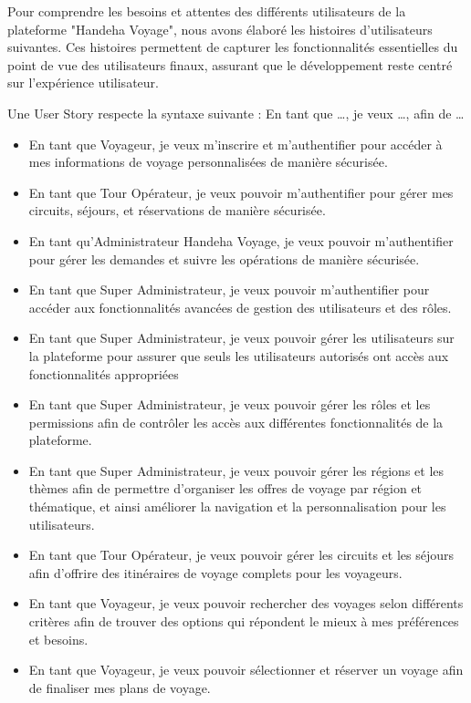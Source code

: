 \documentclass[12pt]{report}
\begin{document}
				\hspace{15pt} Pour comprendre les besoins et attentes des différents utilisateurs de la plateforme "Handeha Voyage", nous avons élaboré les histoires d’utilisateurs suivantes. Ces histoires permettent de capturer les fonctionnalités essentielles du point de vue des utilisateurs finaux, assurant que le développement reste centré sur l’expérience utilisateur. 

				Une User Story respecte la syntaxe suivante : En tant que …, je veux …, afin de …


				\begin{itemize}
					\item En tant que Voyageur, je veux m'inscrire et m'authentifier pour accéder à mes informations de voyage personnalisées de manière sécurisée.
					\item En tant que Tour Opérateur, je veux pouvoir m'authentifier pour gérer mes circuits, séjours, et réservations de manière sécurisée.
					\item En tant qu'Administrateur Handeha Voyage, je veux pouvoir m'authentifier pour gérer les demandes et suivre les opérations de manière sécurisée.
					\item En tant que Super Administrateur, je veux pouvoir m'authentifier pour accéder aux fonctionnalités avancées de gestion des utilisateurs et des rôles.
					\item En tant que Super Administrateur, je veux pouvoir gérer les utilisateurs sur la plateforme pour assurer que seuls les utilisateurs autorisés ont accès aux fonctionnalités appropriées
					\item En tant que Super Administrateur, je veux pouvoir gérer les rôles et les permissions afin de contrôler les accès aux différentes fonctionnalités de la plateforme.
					\item En tant que Super Administrateur, je veux pouvoir gérer les régions et les thèmes afin de permettre d'organiser les offres de voyage par région et thématique, et ainsi améliorer la navigation et la personnalisation pour les utilisateurs.
					\item En tant que Tour Opérateur, je veux pouvoir gérer les circuits et les séjours afin d'offrire des itinéraires de voyage complets pour les voyageurs.
					\item En tant que Voyageur, je veux pouvoir rechercher des voyages selon différents critères afin de trouver des options qui répondent le mieux à mes préférences et besoins.
					\item En tant que Voyageur, je veux pouvoir sélectionner et réserver un voyage afin de finaliser mes plans de voyage.

\end{itemize}
\end{document}
